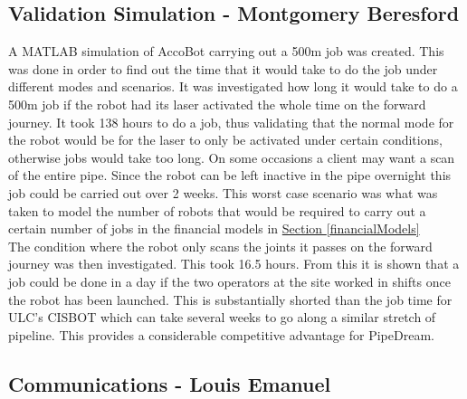 \documentclass[11pt]{article}		%
\newcommand{\sectref}[1]{\hyperref[#1]{Section \ref*{#1}}}     %
\begin{document}
			
	    \subsection[Validation Simulation]{Validation Simulation - Montgomery Beresford}
	        
	   A MATLAB simulation of AccoBot carrying out a 500m job was created. This was done in order to find out the time that it would take to do the job under different modes and scenarios. 
	   It was investigated how long it would take to do a 500m job if the robot had its laser activated the whole time on the forward journey. It took 138 hours to do a job, thus validating that the normal mode for the robot would be for the laser to only be activated under certain conditions, otherwise jobs would take too long. On some occasions a client may want a scan of the entire pipe. Since the robot can be left inactive in the pipe overnight this job could be carried out over 2 weeks. This worst case scenario was what was taken to model the number of robots that would be required to carry out a certain number of jobs in the financial models in \sectref{financialModels}
	  \\ \hspace*{3ex}
	   The condition where the robot only scans the joints it passes on the forward journey was then investigated. This took 16.5 hours. From this it is shown that a job could be done in a day if the two operators at the site worked in shifts once the robot has been launched. This is substantially shorted than the job time for ULC's CISBOT which can take several weeks to go along a similar stretch of pipeline. This provides a considerable competitive advantage for PipeDream.
	
		\subsection[Communications]{Communications - Louis Emanuel}
		    
\end{document}
